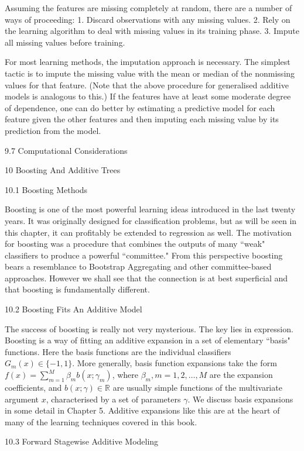 Assuming the features are missing completely at random, there are a
number of ways of proceeding: 1. Discard observations with any missing values. 2. Rely on the learning algorithm to deal with missing values in its training phase. 3. Impute all missing values before training.

For most learning methods, the imputation approach is necessary. The simplest tactic is to impute the missing value with the mean or median of the nonmissing values for that feature. (Note that the above procedure for generalised additive models is analogous to this.) If the features have at least some moderate degree of dependence, one can do better by estimating a predictive model for each feature given the other features and then imputing each missing value by its prediction from the model.

9.7 Computational Considerations



10 Boosting And Additive Trees

10.1 Boosting Methods

Boosting is one of the most powerful learning ideas introduced in the last twenty years. It was originally designed for classification problems, but as will be seen in this chapter, it can profitably be extended to regression as well. The motivation for boosting was a procedure that combines the outputs of many ``weak" classifiers to produce a powerful ``committee." From this perspective boosting bears a resemblance to Bootstrap Aggregating and other committee-based approaches. However we shall see that the connection is at best superficial and that boosting is fundamentally different.

10.2 Boosting Fits An Additive Model

The success of boosting is really not very mysterious. The key lies in expression. Boosting is a way of fitting an additive expansion in a set of elementary ``basis" functions. Here the basis functions are the individual classifiers $G_m(x) \in \{-1,1\}$. More generally, basis function expansions take the form $f(x)=\sum_{m=1}^M \beta_m b(x;\gamma_m)$, where $\beta_m,m=1,2,\dots ,M$ are the expansion coefficients, and $b(x;\gamma ) \in \mathbb{R}$ are usually simple functions of the multivariate argument $x$, characterised by a set of parameters $\gamma$. We discuss basis expansions in some detail in Chapter 5. Additive expansions like this are at the heart of many of the learning techniques covered in this book.

10.3 Forward Stagewise Additive Modeling

